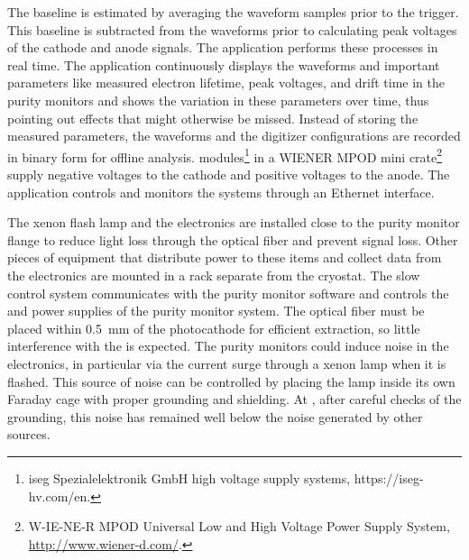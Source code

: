 The baseline  is estimated by averaging the waveform samples prior to the trigger. This baseline is subtracted from the waveforms prior to calculating peak voltages of the cathode and anode signals. %
The application performs these processes in real time. %
 The application continuously displays the waveforms and important parameters like measured electron lifetime, peak voltages, and drift time %
in the purity monitors and shows the variation in these parameters over time, thus pointing out %
effects that might otherwise be missed. %
Instead of storing the measured parameters, the waveforms and the digitizer configurations are recorded in binary form for offline analysis.   modules\footnote{iseg Spezialelektronik GmbH\texttrademark{} high voltage supply systems, https://iseg-hv.com/en.} in a WIENER MPOD mini crate\footnote{W-IE-NE-R MPOD\texttrademark{} Universal Low and High Voltage Power Supply System, \url{http://www.wiener-d.com/}.} supply negative voltages to the cathode and positive voltages to the anode. The  application controls and monitors the  systems through an Ethernet interface.


The xenon flash lamp and the  electronics are installed close to the purity monitor flange to reduce light loss through the optical fiber and prevent signal loss. Other pieces of equipment that distribute power to these items and collect data from the electronics are mounted in a rack separate from the cryostat. The slow control system communicates with the purity monitor  software and controls  the  and  power supplies of the purity monitor system. The optical fiber must be placed within  \SI{0.5}{\milli\meter} of the photocathode for efficient \phel extraction, so little interference with the  is expected. The purity monitors could induce noise in the  electronics, in particular via the current surge through a xenon lamp when it is flashed.  This source of noise can be controlled by placing the lamp inside its own Faraday cage with %
proper grounding and shielding. %
At , after careful checks of the grounding, this noise has remained well below the noise generated by other sources.

